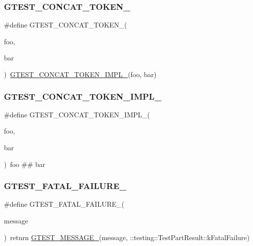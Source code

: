 \subsubsection{\texorpdfstring{GTEST\_CONCAT\_TOKEN\_}{GTEST\_CONCAT\_TOKEN\_}}
{\footnotesize\ttfamily \#define G\+T\+E\+S\+T\+\_\+\+C\+O\+N\+C\+A\+T\+\_\+\+T\+O\+K\+E\+N\+\_\+(\begin{DoxyParamCaption}\item[{}]{foo,  }\item[{}]{bar }\end{DoxyParamCaption})~\mbox{\hyperlink{_obj__test_2lib_2googletest-release-1_88_81_2googletest_2include_2gtest_2internal_2gtest-internal_8h_aa39fb5346d3573feebe4257cb3a01fde}{G\+T\+E\+S\+T\+\_\+\+C\+O\+N\+C\+A\+T\+\_\+\+T\+O\+K\+E\+N\+\_\+\+I\+M\+P\+L\+\_\+}}(foo, bar)}

\mbox{\label{_obj__test_2lib_2googletest-release-1_88_81_2googletest_2include_2gtest_2internal_2gtest-internal_8h_aa39fb5346d3573feebe4257cb3a01fde}} 
\subsubsection{\texorpdfstring{GTEST\_CONCAT\_TOKEN\_IMPL\_}{GTEST\_CONCAT\_TOKEN\_IMPL\_}}
{\footnotesize\ttfamily \#define G\+T\+E\+S\+T\+\_\+\+C\+O\+N\+C\+A\+T\+\_\+\+T\+O\+K\+E\+N\+\_\+\+I\+M\+P\+L\+\_\+(\begin{DoxyParamCaption}\item[{}]{foo,  }\item[{}]{bar }\end{DoxyParamCaption})~foo \#\# bar}

\mbox{\label{_obj__test_2lib_2googletest-release-1_88_81_2googletest_2include_2gtest_2internal_2gtest-internal_8h_a0f9a4c3ea82cc7bf4478eaffdc168358}} 
\subsubsection{\texorpdfstring{GTEST\_FATAL\_FAILURE\_}{GTEST\_FATAL\_FAILURE\_}}
{\footnotesize\ttfamily \#define G\+T\+E\+S\+T\+\_\+\+F\+A\+T\+A\+L\+\_\+\+F\+A\+I\+L\+U\+R\+E\+\_\+(\begin{DoxyParamCaption}\item[{}]{message }\end{DoxyParamCaption})~return \mbox{\hyperlink{_obj__test_2lib_2googletest-release-1_88_81_2googletest_2include_2gtest_2internal_2gtest-internal_8h_a94c73d5368ec946bc354d0992ad00810}{G\+T\+E\+S\+T\+\_\+\+M\+E\+S\+S\+A\+G\+E\+\_\+}}(message, \+::testing\+::\+Test\+Part\+Result\+::k\+Fatal\+Failure)}


